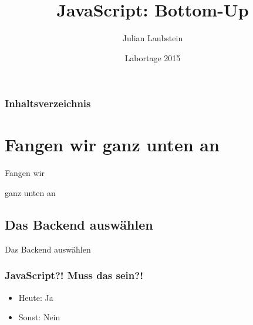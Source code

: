 \documentclass{beamer}
\title[Short title]{JavaScript: Bottom-Up} %
\author{Julian Laubstein} %
\institute[UCLA] %
{
\medskip
\textit{julianlaubstein@yahoo.de} %
}
\date{Labortage 2015} %
\begin{document}
\begin{frame}
\titlepage %
\end{frame}

\begin{frame}
\frametitle{Inhaltsverzeichnis} %
\tableofcontents %
\end{frame}


\section{Fangen wir ganz unten an}

\begin{frame}
\Huge{
\centerline{Fangen wir}
\centerline{ganz unten an}
}
\end{frame}


\subsection{Das Backend auswählen}

\begin{frame}
\Huge{
\centerline{Das Backend auswählen}
}
\end{frame}


\begin{frame}
\frametitle{JavaScript?! Muss das sein?!}
\begin{itemize}
\item Heute: Ja
\item Sonst: Nein
\end{itemize}
\end{frame}
\end{document}
